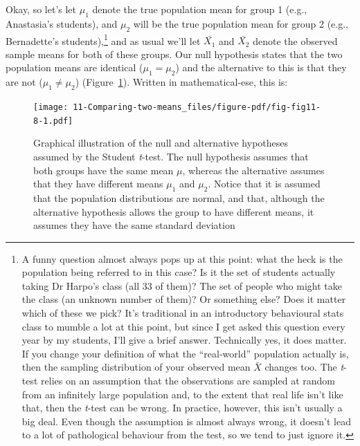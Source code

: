 \documentclass[
  a4paper,
]{book}
\begin{document}
Okay, so let's let \(\mu_1\) denote the true population mean for group 1
(e.g., Anastasia's students), and \(\mu_2\) will be the true population
mean for group 2 (e.g., Bernadette's students),\footnote{A funny
  question almost always pops up at this point: what the heck is the
  population being referred to in this case? Is it the set of students
  actually taking Dr Harpo's class (all 33 of them)? The set of people
  who might take the class (an unknown number of them)? Or something
  else? Does it matter which of these we pick? It's traditional in an
  introductory behavioural stats class to mumble a lot at this point,
  but since I get asked this question every year by my students, I'll
  give a brief answer. Technically yes, it does matter. If you change
  your definition of what the ``real-world'' population actually is,
  then the sampling distribution of your observed mean \(\bar{X}\)
  changes too. The \emph{t}-test relies on an assumption that the
  observations are sampled at random from an infinitely large population
  and, to the extent that real life isn't like that, then the
  \emph{t}-test can be wrong. In practice, however, this isn't usually a
  big deal. Even though the assumption is almost always wrong, it
  doesn't lead to a lot of pathological behaviour from the test, so we
  tend to just ignore it.} and as usual we'll let \(\bar{X_1}\) and
\(\bar{X_2}\) denote the observed sample means for both of these groups.
Our null hypothesis states that the two population means are identical
(\(\mu_1 = \mu_2\)) and the alternative to this is that they are not
(\(\mu_1 \neq \mu_2\)) (Figure~\ref{fig-fig11-8}). Written in
mathematical-ese, this is:

\begin{figure}

\texttt{[image: 11-Comparing-two-means\_files/figure-pdf/fig-fig11-8-1.pdf]} \hfill{}

\caption{\label{fig-fig11-8}Graphical illustration of the null and
alternative hypotheses assumed by the Student \emph{t}-test. The null
hypothesis assumes that both groups have the same mean \(\mu\), whereas
the alternative assumes that they have different means \(\mu_1\) and
\(\mu_2\). Notice that it is assumed that the population distributions
are normal, and that, although the alternative hypothesis allows the
group to have different means, it assumes they have the same standard
deviation}

\end{figure}
\end{document}
